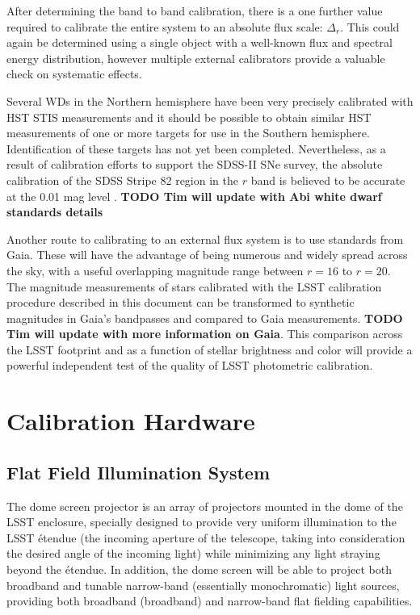 \documentclass[12pt,preprint]{aastex}
\begin{document}
After determining the band to band calibration, there is a one further
value required to calibrate the entire system to an absolute flux
scale: $\Delta_r$.  This could again be determined using a single
object with a well-known flux and spectral energy distribution,
however multiple external calibrators provide a valuable check on
systematic effects. 

Several WDs in the Northern hemisphere have been very precisely
calibrated with HST STIS measurements \citep{2004AJ....128.3053B} and
it should be possible to obtain similar HST measurements of one or
more targets for use in the Southern hemisphere. Identification of
these targets has not yet been completed. Nevertheless, as a result of
calibration efforts to support the SDSS-II SNe survey, the absolute
calibration of the SDSS Stripe 82 region in the $r$ band is believed
to be accurate at the 0.01 mag level \citep{Frieman2008}. 
{\bf TODO Tim will update with Abi white dwarf standards details}

Another route to calibrating to an external flux system is to use
standards from Gaia. These will have the advantage of being numerous
and widely spread across the sky, with a useful overlapping magnitude range between
$r=16$ to $r=20$.  The magnitude measurements of stars calibrated with
the LSST calibration procedure described in this document can be
transformed to synthetic magnitudes in Gaia's bandpasses and compared
to Gaia measurements. 
{\bf TODO Tim will update with more information on Gaia}.
 This comparison across the LSST footprint and as
a function of stellar brightness and color will provide a powerful
independent test of the quality of LSST photometric calibration. 

\section{Calibration Hardware}
\label{sec:calib_hardware}

\subsection{Flat Field Illumination System}
The dome screen projector is an array of projectors mounted in the
dome of the LSST enclosure, specially designed to provide very uniform
illumination to the LSST \'{e}tendue (the incoming aperture of the
telescope, taking into consideration the desired angle of the incoming
light) while minimizing any light straying beyond the \'{e}tendue. In
addition, the dome screen will be able to project both broadband and
tunable narrow-band (essentially monochromatic) light sources,
providing both broadband (broadband) and narrow-band flat fielding
capabilities.  
\end{document}

